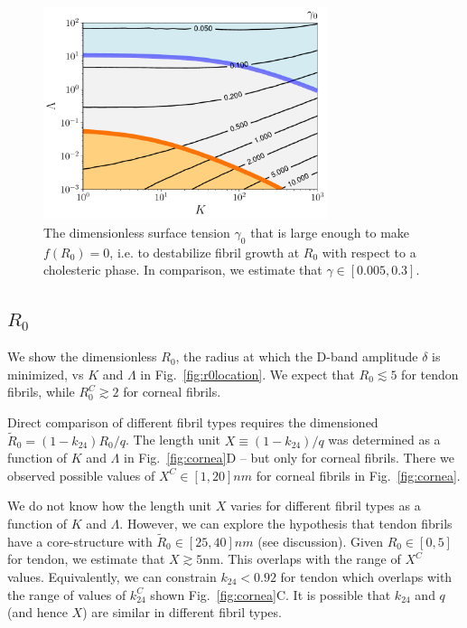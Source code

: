 \documentclass[twoside,twocolumn,9pt]{article}
\begin{document}
\begin{figure}[t!] %
\centering
  \includegraphics[width=8.3cm]{figure9.pdf}
  \caption{The dimensionless surface tension $\gamma_0$ that is large enough to make $f(R_0)=0$, i.e. to destabilize fibril growth at $R_0$ with respect to a cholesteric phase. In comparison, we estimate that $\gamma \in [0.005,0.3]$.}
  \label{fig:gamma}
\end{figure}

\subsection{$R_0$}
We show the dimensionless $R_0$, the radius at which the D-band amplitude $\delta$ is minimized, vs $K$ and $\Lambda$ in Fig.~\ref{fig:r0location}. We expect that $R_0 \lesssim 5$ for tendon fibrils, while $R_0^C \gtrsim 2$ for corneal fibrils. 

Direct comparison of different fibril types requires the dimensioned $\tilde{R}_0 = (1-k_{24}) R_0/q$. The length unit $X \equiv (1-k_{24})/q$ was determined  as a function of $K$ and $\Lambda$ in Fig.~\ref{fig:cornea}D  -- but only for corneal fibrils. There we observed possible values of $X^C \in [1,20]nm$ for corneal fibrils in Fig.~\ref{fig:cornea}.

We do not know how the length unit $X$ varies for different fibril types as a function of $K$ and $\Lambda$. However, we can explore the hypothesis that tendon fibrils have a core-structure with $\tilde{R}_0 \in [25, 40]nm$ (see discussion). Given $R_0 \in [0,5]$ for tendon, we estimate that $X \gtrsim 5$nm. This overlaps with the range of $X^C$ values. Equivalently, we can constrain $k_{24} < 0.92$ for tendon which overlaps with the range of values of $k_{24}^C$ shown Fig.~\ref{fig:cornea}C. It is possible that $k_{24}$ and $q$ (and hence $X$) are similar in different fibril types. 
\end{document}
